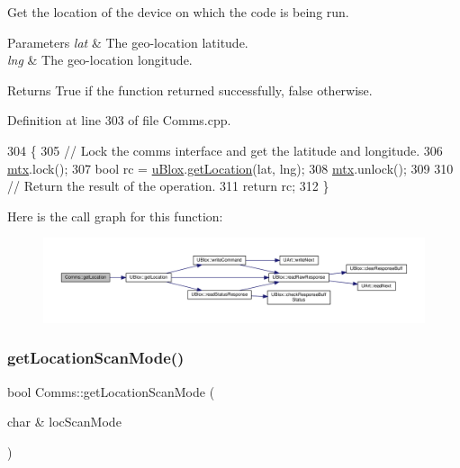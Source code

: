 Get the location of the device on which the code is being run.


\begin{DoxyParams}{Parameters}
{\em lat} & The geo-\/location latitude. \\
\hline
{\em lng} & The geo-\/location longitude. \\
\hline
\end{DoxyParams}
\begin{DoxyReturn}{Returns}
True if the function returned successfully, false otherwise. 
\end{DoxyReturn}


Definition at line 303 of file Comms.\+cpp.


\begin{DoxyCode}
304 \{
305     \textcolor{comment}{// Lock the comms interface and get the latitude and longitude.}
306     \hyperlink{class_comms_a21df861b1202573e4cd0cb5666d638fe}{mtx}.lock();
307     \textcolor{keywordtype}{bool} rc = \hyperlink{class_comms_ac64dea134b116147e5441172346dbd6c}{uBlox}.\hyperlink{class_u_blox_a2443d175bbf55a4f4facc5d8a99d2723}{getLocation}(lat, lng);
308     \hyperlink{class_comms_a21df861b1202573e4cd0cb5666d638fe}{mtx}.unlock();
309 
310     \textcolor{comment}{// Return the result of the operation.}
311     \textcolor{keywordflow}{return} rc;
312 \}
\end{DoxyCode}
Here is the call graph for this function\+:
\nopagebreak
\begin{figure}[H]
\begin{center}
\leavevmode
\includegraphics[width=350pt]{d8/dcc/class_comms_a083b399b3115711b1e2d55f800cac58c_cgraph}
\end{center}
\end{figure}
\mbox{\label{class_comms_a8f9893e235e62f8fc752f05a06383e68}} 
\subsubsection{\texorpdfstring{get\+Location\+Scan\+Mode()}{getLocationScanMode()}}
{\footnotesize\ttfamily bool Comms\+::get\+Location\+Scan\+Mode (\begin{DoxyParamCaption}\item[{char \&}]{loc\+Scan\+Mode }\end{DoxyParamCaption})}

